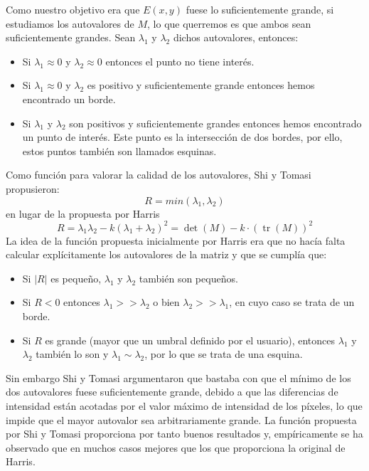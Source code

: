 \documentclass[a4paper,openright, 12pt]{book}
\begin{document}
Como nuestro objetivo era que $E(x,y)$ fuese lo suficientemente grande, si estudiamos los autovalores de $M$, lo que querremos es que ambos sean suficientemente grandes.
Sean $\lambda_1$ y $\lambda_2$ dichos autovalores, entonces:
\begin{itemize}
\item Si  $ \lambda_1 \approx 0 $ y $\lambda_2 \approx 0 $ entonces el punto no tiene interés.
\item Si  $ \lambda_1 \approx 0 $ y $\lambda_2 $ es positivo y suficientemente grande entonces hemos encontrado un borde.
\item Si  $ \lambda_1 $ y $\lambda_2 $ son positivos y suficientemente grandes entonces hemos encontrado un punto de interés. Este punto es la intersección de dos bordes, por ello, estos puntos también son llamados esquinas.
\end{itemize}
Como función para valorar la calidad de los autovalores, Shi y Tomasi \cite{shiandtomasi} propusieron:
\begin{equation*}
R = min(\lambda_1, \lambda_2)
\end{equation*}
en lugar de la propuesta por Harris\cite{harris88}
\begin{equation*}
R = \lambda_1 \lambda_2 - k(\lambda_1 + \lambda_2)^2 = \operatorname{det}(M) - k\cdot(\operatorname{tr}(M))^2
\end{equation*}
La idea de la función propuesta inicialmente por Harris era que no hacía falta calcular explícitamente los autovalores de la matriz y que se cumplía que:
\begin{itemize}
 \item Si $|R|$ es pequeño, $\lambda_1$ y $\lambda_2$ también son pequeños.
 \item Si $R<0$ entonces $\lambda_1>>\lambda_2$ o bien $\lambda_2>>\lambda_1$, en cuyo caso se trata de un borde.
 \item Si $R$ es grande (mayor que un umbral definido por el usuario), entonces  $\lambda_1$ y $\lambda_2$ también lo son y $\lambda_1 \sim \lambda_2$, por lo que se trata de una esquina.
 \end{itemize}
 
Sin embargo Shi y Tomasi argumentaron que bastaba con que el mínimo de los dos autovalores fuese suficientemente grande, debido a que las diferencias de intensidad están acotadas por el valor máximo de intensidad de los píxeles, lo que impide que el mayor autovalor sea arbitrariamente grande.
La función propuesta por Shi y Tomasi proporciona por tanto buenos resultados y, empíricamente se ha observado que en muchos casos mejores que los que proporciona la original de Harris.
\end{document}
